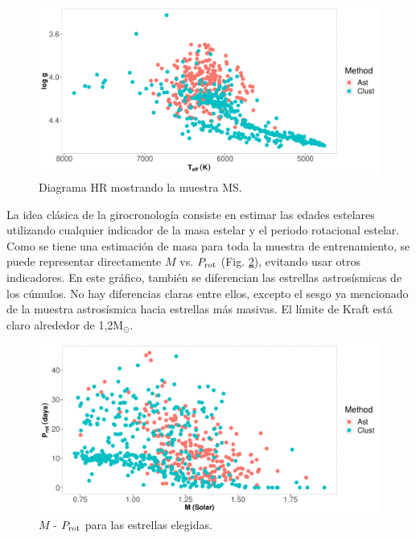 \begin{figure}[H]
\begin{center}
\includegraphics[width=0.9\linewidth]{Figuras/sampling_MS_astro_clust_embedded.pdf}
\end{center}
\caption{Diagrama HR mostrando la muestra MS.}
 \label{Fig:HR_select}
\end{figure}

La idea clásica de la girocronología consiste en estimar las edades estelares utilizando cualquier indicador de la masa estelar y el periodo rotacional estelar. Como se tiene una estimación de masa para toda la muestra de entrenamiento, se puede representar directamente $M$ vs. $P_{\rm rot}$ (Fig. \ref{Fig:M_rot}), evitando usar otros indicadores. En este gráfico, también se diferencian las estrellas astrosísmicas de los cúmulos. No hay diferencias claras entre ellos, excepto el sesgo ya mencionado de la muestra astrosísmica hacia estrellas más masivas. El límite de Kraft está claro alrededor de 1,2M$_\odot$.

\begin{figure}[H]
\begin{center}
 \includegraphics[width=0.9\linewidth]{Figuras/M_Prot_embedded.pdf}
\end{center}
\caption{$M$ - $P_{\rm rot}$ para las estrellas elegidas.}
 \label{Fig:M_rot}
\end{figure}


